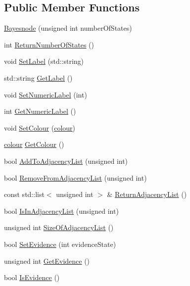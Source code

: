 \subsection*{Public Member Functions}
\begin{DoxyCompactItemize}
\item 
\hyperlink{classbayonet_1_1_bayesnode_a2b676188453fbbb4dc96be714ac931d3}{Bayesnode} (unsigned int number\-Of\-States)
\item 
int \hyperlink{classbayonet_1_1_bayesnode_a25297ec446c6be1a79e70d3930bef834}{Return\-Number\-Of\-States} ()
\item 
void \hyperlink{classbayonet_1_1_bayesnode_abaa27f1597d5599344e3a4d82e7b64b0}{Set\-Label} (std\-::string)
\item 
std\-::string \hyperlink{classbayonet_1_1_bayesnode_aebe7f411efe8b8647ed6f7d28f700638}{Get\-Label} ()
\item 
void \hyperlink{classbayonet_1_1_bayesnode_adbda396fa53b6923a69824c98fce9ca1}{Set\-Numeric\-Label} (int)
\item 
int \hyperlink{classbayonet_1_1_bayesnode_a347df4c4cac0f04f6b263a3523ea37d5}{Get\-Numeric\-Label} ()
\item 
void \hyperlink{classbayonet_1_1_bayesnode_a1102ecda4b933a2ccce879ca520a795e}{Set\-Colour} (\hyperlink{classbayonet_1_1_bayesnode_a6294bd0f5387871bc5f39f57cc1f0fb3}{colour})
\item 
\hyperlink{classbayonet_1_1_bayesnode_a6294bd0f5387871bc5f39f57cc1f0fb3}{colour} \hyperlink{classbayonet_1_1_bayesnode_a9f4a34547a9dab484a683450cd68691c}{Get\-Colour} ()
\item 
bool \hyperlink{classbayonet_1_1_bayesnode_ab3c6995309d67dd9b30c645fbb1cb739}{Add\-To\-Adjacency\-List} (unsigned int)
\item 
bool \hyperlink{classbayonet_1_1_bayesnode_a96768ee5d89848d3275c7d916faad480}{Remove\-From\-Adjacency\-List} (unsigned int)
\item 
const std\-::list$<$ unsigned int $>$ \& \hyperlink{classbayonet_1_1_bayesnode_ad20de796507c48523bcf49fffdc7b3d5}{Return\-Adjacency\-List} ()
\item 
bool \hyperlink{classbayonet_1_1_bayesnode_a531f3d3341170ba4ea6d646f1a368b54}{Is\-In\-Adjacency\-List} (unsigned int)
\item 
unsigned int \hyperlink{classbayonet_1_1_bayesnode_a33a92e17091b3d0361d63eeadbbd39b6}{Size\-Of\-Adjacency\-List} ()
\item 
bool \hyperlink{classbayonet_1_1_bayesnode_a8478f3ae03c4a479dba6b1f9cb2c69af}{Set\-Evidence} (int evidence\-State)
\item 
unsigned int \hyperlink{classbayonet_1_1_bayesnode_a783735e7bb2ec04a07a209a8c83f95cd}{Get\-Evidence} ()
\item 
bool \hyperlink{classbayonet_1_1_bayesnode_a71a90c0403ecb1441d43af3978200fd2}{Is\-Evidence} ()
\end{DoxyCompactItemize}
